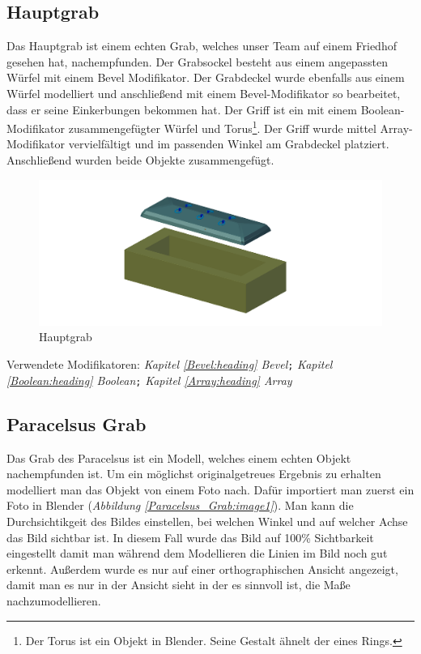 \subsection{Hauptgrab}
\label{Hauptgrab:Heading}
Das Hauptgrab ist einem echten Grab, welches unser Team auf einem Friedhof gesehen hat, nachempfunden. Der Grabsockel besteht aus einem angepassten Würfel
mit einem Bevel Modifikator. Der Grabdeckel wurde ebenfalls aus einem Würfel modelliert und anschließend mit einem Bevel-Modifikator so bearbeitet, dass
er seine Einkerbungen bekommen hat. Der Griff ist ein mit einem Boolean-Modifikator zusammengefügter Würfel und Torus\footnote{Der Torus ist ein Objekt in Blender. Seine Gestalt ähnelt der eines Rings.}.
Der Griff wurde mittel Array-Modifikator vervielfältigt und im passenden Winkel am Grabdeckel platziert. Anschließend wurden beide Objekte zusammengefügt.

\raggedbottom
\begin{figure}[H]
    \centering
    \includegraphics[width=.8\textwidth]{images/Hauptgrab_Grab.png}
    \caption{Hauptgrab}
    \label{Hauptgrab:Image1}
\end{figure}

Verwendete Modifikatoren: \textit{Kapitel \ref{Bevel:heading} \dq Bevel\dq}\verb+;+ \textit{Kapitel \ref{Boolean:heading} \dq Boolean\dq}\verb+;+ \textit{Kapitel \ref{Array:heading} \dq Array\dq}

\subsection{Paracelsus Grab}
\label{paracelsusgrab:ref1}
Das Grab des Paracelsus ist ein Modell, welches einem echten Objekt nachempfunden ist. Um ein möglichst originalgetreues Ergebnis zu erhalten
modelliert man das Objekt von einem Foto nach. Dafür importiert man zuerst ein Foto in Blender (\textit{Abbildung \ref{Paracelsus_Grab:image1}}).
Man kann die Durchsichtikgeit des Bildes einstellen, bei welchen Winkel und auf welcher Achse das Bild sichtbar ist.
In diesem Fall wurde das Bild auf 100\% Sichtbarkeit eingestellt damit man während dem Modellieren die Linien im Bild noch gut erkennt.
Außerdem wurde es nur auf einer orthographischen Ansicht angezeigt, damit man es nur in der Ansicht sieht in der es sinnvoll ist, die Maße nachzumodellieren.

